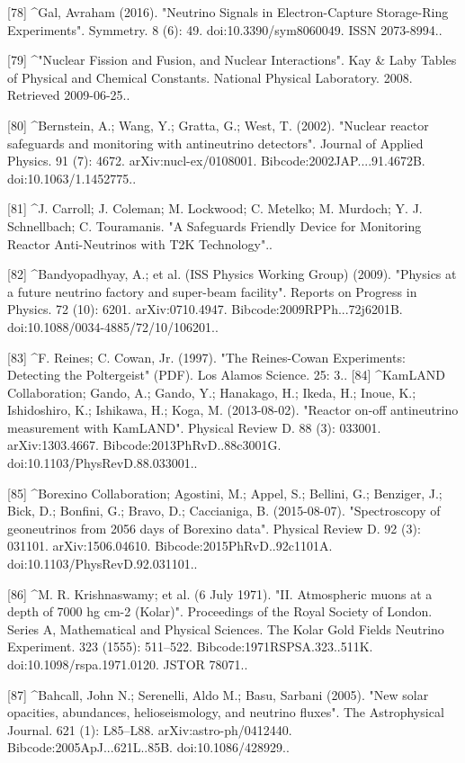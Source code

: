 [78]
^Gal, Avraham (2016). "Neutrino Signals in Electron-Capture Storage-Ring Experiments". Symmetry. 8 (6): 49. doi:10.3390/sym8060049. ISSN 2073-8994..

[79]
^"Nuclear Fission and Fusion, and Nuclear Interactions". Kay & Laby Tables of Physical and Chemical Constants. National Physical Laboratory. 2008. 
Retrieved 2009-06-25..

[80]
^Bernstein, A.; Wang, Y.; Gratta, G.; West, T. (2002). "Nuclear reactor safeguards and monitoring with antineutrino detectors". Journal of Applied Physics. 91 (7): 4672. arXiv:nucl-ex/0108001. Bibcode:2002JAP....91.4672B. doi:10.1063/1.1452775..

[81]
^J. Carroll; J. Coleman; M. Lockwood; C. Metelko; M. Murdoch; Y. J. Schnellbach; C. Touramanis. "A Safeguards Friendly Device for Monitoring Reactor Anti-Neutrinos with T2K Technology"..

[82]
^Bandyopadhyay, A.; et al. (ISS Physics Working Group) (2009). "Physics at a future neutrino factory and super-beam facility". Reports on Progress in Physics. 72 (10): 6201. arXiv:0710.4947. Bibcode:2009RPPh...72j6201B. doi:10.1088/0034-4885/72/10/106201..

[83]
^F. Reines; C. Cowan, Jr. (1997). "The Reines-Cowan Experiments: Detecting the Poltergeist" (PDF). Los Alamos Science. 25: 3..
[84]
^KamLAND Collaboration; Gando, A.; Gando, Y.; Hanakago, H.; Ikeda, H.; Inoue, K.; Ishidoshiro, K.; Ishikawa, H.; Koga, M. (2013-08-02). "Reactor on-off antineutrino measurement with KamLAND". Physical Review D. 88 (3): 033001. arXiv:1303.4667. Bibcode:2013PhRvD..88c3001G. doi:10.1103/PhysRevD.88.033001..

[85]
^Borexino Collaboration; Agostini, M.; Appel, S.; Bellini, G.; Benziger, J.; Bick, D.; Bonfini, G.; Bravo, D.; Caccianiga, B. (2015-08-07). "Spectroscopy of geoneutrinos from 2056 days of Borexino data". Physical Review D. 92 (3): 031101. arXiv:1506.04610. Bibcode:2015PhRvD..92c1101A. doi:10.1103/PhysRevD.92.031101..

[86]
^M. R. Krishnaswamy; et al. (6 July 1971). "II. Atmospheric muons at a depth of 7000 hg cm-2 (Kolar)". Proceedings of the Royal Society of London. Series A, Mathematical and Physical Sciences. The Kolar Gold Fields Neutrino Experiment. 323 (1555): 511–522. Bibcode:1971RSPSA.323..511K. doi:10.1098/rspa.1971.0120. JSTOR 78071..

[87]
^Bahcall, John N.; Serenelli, Aldo M.; Basu, Sarbani (2005). "New solar opacities, abundances, helioseismology, and neutrino fluxes". The Astrophysical Journal. 621 (1): L85–L88. arXiv:astro-ph/0412440. Bibcode:2005ApJ...621L..85B. doi:10.1086/428929..

